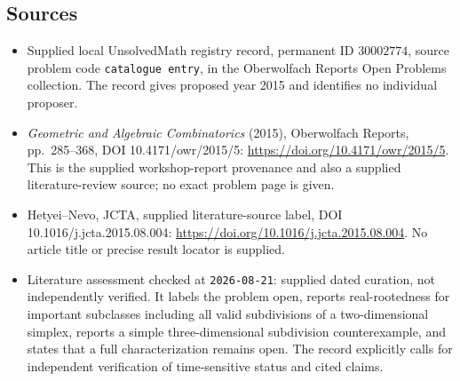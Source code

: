 \documentclass[11pt]{article}
\begin{document}
\subsection{Sources}
\begin{itemize}
\item Supplied local UnsolvedMath registry record, permanent ID \(30002774\), source problem code \texttt{catalogue entry}, in the Oberwolfach Reports Open Problems collection. The record gives proposed year 2015 and identifies no individual proposer.
\item \emph{Geometric and Algebraic Combinatorics} (2015), Oberwolfach Reports, pp.\ 285--368, DOI 10.4171/owr/2015/5: \url{https://doi.org/10.4171/owr/2015/5}. This is the supplied workshop-report provenance and also a supplied literature-review source; no exact problem page is given.
\item Hetyei--Nevo, JCTA, supplied literature-source label, DOI 10.1016/j.jcta.2015.08.004: \url{https://doi.org/10.1016/j.jcta.2015.08.004}. No article title or precise result locator is supplied.
\item Literature assessment checked at \texttt{2026-08-21}: supplied dated curation, not independently verified. It labels the problem open, reports real-rootedness for important subclasses including all valid subdivisions of a two-dimensional simplex, reports a simple three-dimensional subdivision counterexample, and states that a full characterization remains open. The record explicitly calls for independent verification of time-sensitive status and cited claims.
\end{itemize}
\end{document}
